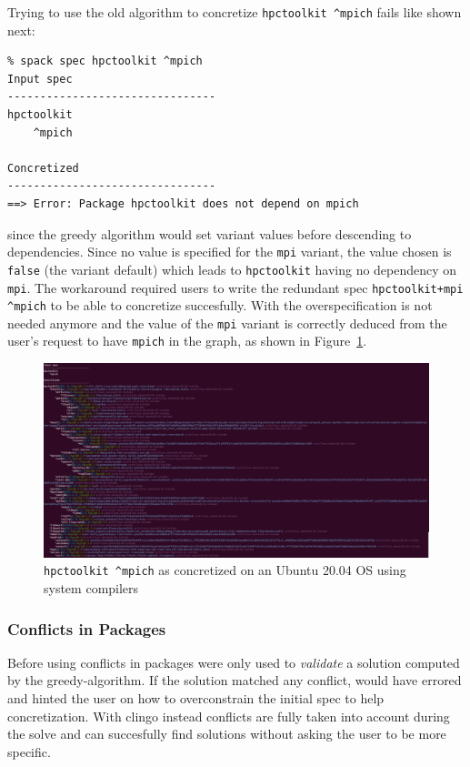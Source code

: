 Trying to use the old algorithm to concretize \texttt{hpctoolkit \^{}mpich} fails like shown next:

\begin{verbatim}
% spack spec hpctoolkit ^mpich
Input spec
--------------------------------
hpctoolkit
    ^mpich

Concretized
--------------------------------
==> Error: Package hpctoolkit does not depend on mpich
\end{verbatim}

since the greedy algorithm would set variant values before descending to dependencies. Since no value is specified for the \texttt{mpi} variant, the value chosen is \texttt{false} (the variant default) which leads to \texttt{hpctoolkit} having no dependency on \texttt{mpi}. The workaround required users to write the redundant spec \texttt{hpctoolkit+mpi \^{}mpich} to be able to concretize succesfully. With \clingo{} the overspecification is not needed anymore and the value of the \texttt{mpi} variant is correctly deduced from the user's request to have \texttt{mpich} in the graph, as shown
in Figure~\ref{fig:hpctoolkit}.

\begin{figure}[h]
\includegraphics[width=\columnwidth]{figures/hpctoolkit_concretized.png}
\caption{\texttt{hpctoolkit \^{}mpich} as concretized on an Ubuntu 20.04 OS using system compilers}
\label{fig:hpctoolkit}
\end{figure}

\subsubsection{Conflicts in Packages}
Before using \clingo{} conflicts in packages were only used to \emph{validate} a solution computed by the greedy-algorithm. If the solution matched any conflict, \spack{} would have errored and hinted the user on how to overconstrain the initial spec to help concretization. With clingo instead conflicts are fully taken into account during the solve\footnotemark{} and \spack{} can succesfully find solutions without asking the user to be more specific.

